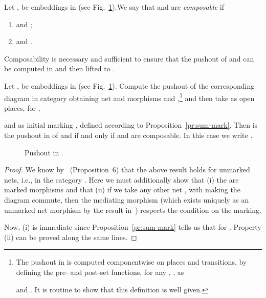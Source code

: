 \documentclass{LMCS}
\begin{document}
\begin{defi}
  \label{de:composable}
  Let ,  be embeddings in
   (see Fig.~\ref{fi:pushout-onet}).We say that  and  are \emph{composable} if
  \begin{enumerate}[(1)]
  \item
  and
    ;

  \item 
 and
    .
  \end{enumerate}
\end{defi}

Composability is necessary and sufficient to ensure that the pushout
of  and  can be computed in  and then lifted to
.

\begin{prop}[pushouts in ]
  \label{pr:push-onet}
  Let ,  be
  embeddings in  
(see Fig.~\ref{fi:pushout-onet}).
Compute the pushout of the corresponding diagram in category 
  obtaining net  and morphisms  and
  ,\footnote{The pushout in  is computed componentwise
    on places and transitions, by defining the pre- and post-set
    functions, for any , , as
    
    and . It is routine to show that this definition is well given.}
and then take as open places, for
  ,
  \begin{center}
    
  \end{center}
  and as initial marking  ,  defined according to
  Proposition~\ref{pr:sum-mark}.
Then  is the pushout in  of 
  and  if and only if  and  are composable.
In this case we write .
\end{prop}


  \begin{figure}[t]
  
  
  
  \caption{Pushout in .}
  \label{fi:pushout-onet}
\end{figure}



\begin{proof}
  We know by~\cite{BCEH:CSOP} (Proposition~6) that the above result
  holds for unmarked nets, i.e., in the category .
Here we must additionally show that (i) the  are
  marked morphisms and that (ii) if we take any other net , with
   making the diagram commute, then the
  mediating morphism  (which exists uniquely as
  an unmarked net morphism by the result in~\cite{BCEH:CSOP}) respects the
  condition on the marking.
  
  Now, (i) is immediate since Proposition~\ref{pr:sum-mark} tells us that
   for .
Property (ii) can be proved along the same lines.
\end{proof}
\end{document}
